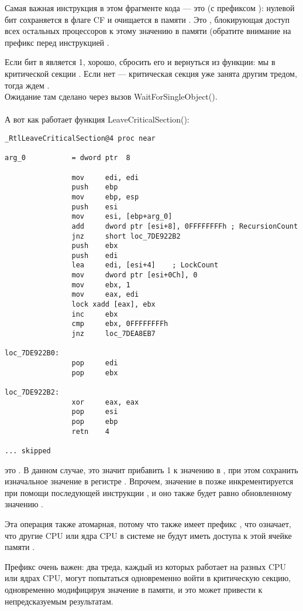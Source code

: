 Самая важная инструкция в этом фрагменте кода --- это
(с префиксом ): 
нулевой бит сохраняется в флаге CF и очищается в памяти
.
Это , 
блокирующая доступ всех остальных процессоров
к этому значению в памяти (обратите внимание на префикс  перед инструкцией .

Если бит в  является 1, 
хорошо, сбросить его и вернуться из функции: мы в критической секции
.
Если нет --- критическая секция уже занята другим тредом, тогда ждем
. \\
Ожидание там сделано через вызов WaitForSingleObject(). \\
\\
А вот как работает функция LeaveCriticalSection():

\begin{lstlisting}[caption=Windows 2008/ntdll.dll/x86 (begin),style=customasmx86]
_RtlLeaveCriticalSection@4 proc near

arg_0           = dword ptr  8

                mov     edi, edi
                push    ebp
                mov     ebp, esp
                push    esi
                mov     esi, [ebp+arg_0]
                add     dword ptr [esi+8], 0FFFFFFFFh ; RecursionCount
                jnz     short loc_7DE922B2
                push    ebx
                push    edi
                lea     edi, [esi+4]    ; LockCount
                mov     dword ptr [esi+0Ch], 0
                mov     ebx, 1
                mov     eax, edi
                lock xadd [eax], ebx
                inc     ebx
                cmp     ebx, 0FFFFFFFFh
                jnz     loc_7DEA8EB7

loc_7DE922B0:
                pop     edi
                pop     ebx

loc_7DE922B2:
                xor     eax, eax
                pop     esi
                pop     ebp
                retn    4

... skipped
\end{lstlisting}

 это .
В данном случае, это значит прибавить 1 к значению в , при этом сохранить изначальное значение 
в регистре .
Впрочем, значение в  позже инкрементируется при помощи последующей инструкции ,
и оно также будет равно обновленному значению .

Эта операция также атомарная, потому что также имеет префикс , что означает, что другие CPU
или ядра CPU в системе не будут иметь доступа к этой ячейке памяти
.

Префикс  очень важен: 
два треда, каждый из которых работает на разных CPU или ядрах CPU, могут попытаться одновременно
войти в критическую секцию, одновременно модифицируя значение в памяти, и это может привести к
непредсказуемым результатам.




